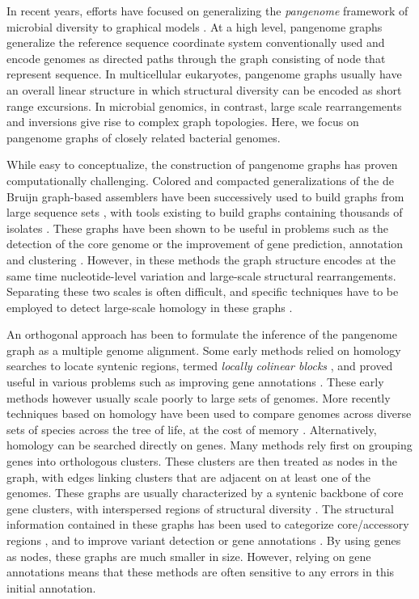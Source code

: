 \documentclass[aps,rmp,preprint,superscriptaddress,10pt,linenumbers]{revtex4-1}
\begin{document}
In recent years, efforts have focused on generalizing the \emph{pangenome} framework of microbial diversity to graphical models \cite{eizenga2020pangenome}.
At a high level, pangenome graphs generalize the reference sequence coordinate system conventionally used and encode genomes as directed paths through the graph consisting of node that represent sequence.
In multicellular eukaryotes, pangenome graphs usually have an overall linear structure in which structural diversity can be encoded as short range  excursions.
In microbial genomics, in contrast, large scale rearrangements and inversions give rise to complex graph topologies.
Here, we focus on pangenome graphs of closely related bacterial genomes.

While easy to conceptualize, the construction of pangenome graphs has proven computationally challenging.
Colored and compacted generalizations of the de Bruijn graph-based assemblers have been successively used to build graphs from large sequence sets \cite{iqbal2012novo,muggli2017succinct}, with tools existing to build graphs containing thousands of isolates \cite{holley2020bifrost}. These graphs have been shown to be useful in problems such as the detection of the core genome \cite{schulz2022sequence} or the improvement of gene prediction, annotation and clustering \cite{horsfield2023accurate}. However, in these methods the graph structure encodes at the same time nucleotide-level variation and large-scale structural rearrangements. Separating these two scales is often difficult, and specific techniques have to be employed to detect large-scale homology in these graphs \cite{angiuoli2011mugsy,minkin2013sibelia}.

An orthogonal approach has been to formulate the inference of the pangenome graph as a multiple genome alignment.
Some early methods relied on homology searches to locate syntenic regions, termed \textit{locally colinear blocks} \cite{angiuoli2011mugsy,darling2010progressivemauve}, and proved useful in various problems such as improving gene annotations \cite{angiuoli2011improving}. These early methods however usually scale poorly to large sets of genomes.
More recently techniques based on homology have been used to compare genomes across diverse sets of species across the tree of life, at the cost of memory \cite{armstrong2020progressive}.
Alternatively, homology can be searched directly on genes. Many methods rely first on grouping genes into orthologous clusters. These clusters are then treated as nodes in the graph, with edges linking clusters that are adjacent on at least one of the genomes.
These graphs are usually characterized by a syntenic backbone of core gene clusters, with interspersed regions of structural diversity \cite{chan2015novel,oliveira2017chromosomal}.
The structural information contained in these graphs has been used to categorize core/accessory regions \cite{sutton2021pan,gautreau2020ppanggolin}, and to improve variant detection \cite{colquhoun2021pandora} or gene annotations \cite{tonkin2020producing,zhou2020accurate}. By using genes as nodes, these graphs are much smaller in size. However, relying on gene annotations means that these methods are often sensitive to any errors in this initial annotation.
\end{document}
